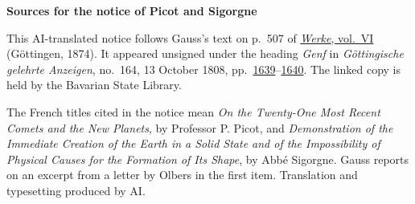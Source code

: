 \clearpage\thispagestyle{empty}
\begin{center}\textbf{Sources for the notice of Picot and Sigorgne}\end{center}
\noindent This AI-translated notice follows Gauss’s text on p.~507 of \href{https://gdz.sub.uni-goettingen.de/id/PPN236007467}{\textit{Werke}, vol.~VI} (Göttingen, 1874). It appeared unsigned under the heading \emph{Genf} in \textit{Göttingische gelehrte Anzeigen}, no.~164, 13 October 1808, pp.~\href{https://api.digitale-sammlungen.de/iiif/image/v2/bsb10538674_00623/full/1800,/0/default.jpg}{1639}--\href{https://api.digitale-sammlungen.de/iiif/image/v2/bsb10538674_00624/full/1800,/0/default.jpg}{1640}. The linked copy is held by the Bavarian State Library.
\par\smallskip\noindent The French titles cited in the notice mean \emph{On the Twenty-One Most Recent Comets and the New Planets}, by Professor P. Picot, and \emph{Demonstration of the Immediate Creation of the Earth in a Solid State and of the Impossibility of Physical Causes for the Formation of Its Shape}, by Abbé Sigorgne. Gauss reports on an excerpt from a letter by Olbers in the first item. Translation and typesetting produced by AI.
\clearpage
